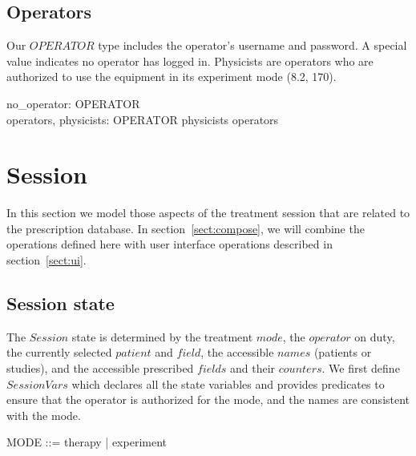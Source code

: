 \documentclass{article}
\begin{document}

\subsection{Operators} \label{sect:opers}

Our $OPERATOR$ type includes the operator's username and password.  A
special value indicates no operator has logged in.  Physicists are
operators who are authorized to use the equipment in its experiment
mode (8.2, 170).

\begin{zed} [OPERATOR] \end{zed}

\begin{axdef}
	no\_operator: OPERATOR \\
	operators, physicists: \power OPERATOR
\where
	physicists \subseteq operators
\end{axdef}

\section{Session} \label{sect:session}

In this section we model those aspects of the treatment session that
are related to the prescription database.  In
section~\ref{sect:compose}, we will combine the operations defined
here with user interface operations described in
section~\ref{sect:ui}.

\subsection{Session state}

The $Session$ state is determined by the treatment $mode$, the
$operator$ on duty, the currently selected $patient$ and $field$, the
accessible $names$ (patients or studies), and the accessible
prescribed $fields$ and their $counters$.  We first define
$SessionVars$ which declares all the state variables and provides
predicates to ensure that the operator is authorized for the mode, and
the names are consistent with the mode.

\begin{zed}
	MODE ::= therapy | experiment
\end{zed}
\end{document}
